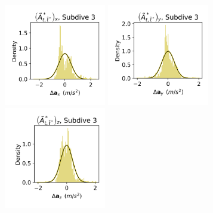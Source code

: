 \documentclass{article}
\begin{document}
\begin{center}
        \includegraphics[width=1.75in]{../Plots/2019/20190902-182840-CATs_OB_1_0_267_HHMM_empirical_hist_Ax_2.png}
        \includegraphics[width=1.75in]{../Plots/2019/20190902-182840-CATs_OB_1_0_267_HHMM_empirical_hist_Ay_2.png}
        \includegraphics[width=1.75in]{../Plots/2019/20190902-182840-CATs_OB_1_0_267_HHMM_empirical_hist_Az_2.png}
        

\end{center}
\end{document}
